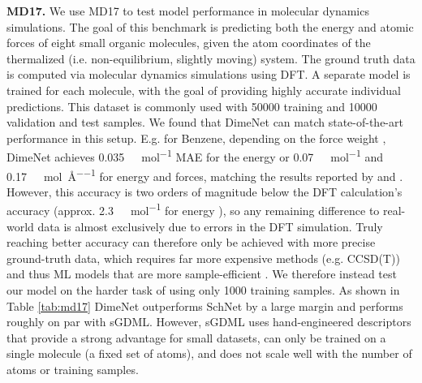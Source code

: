 \documentclass{article} \usepackage{iclr2020_conference,times}
\begin{document}
\textbf{MD17.} We use MD17 \citep{chmiela_machine_2017} to test model performance in molecular dynamics simulations. The goal of this benchmark is predicting both the energy and atomic forces of eight small organic molecules, given the atom coordinates of the thermalized (i.e. non-equilibrium, slightly moving) system. The ground truth data is computed via molecular dynamics simulations using DFT. A separate model is trained for each molecule, with the goal of providing highly accurate individual predictions. This dataset is commonly used with \num{50000} training and \num{10000} validation and test samples. We found that DimeNet can match state-of-the-art performance in this setup. E.g. for Benzene, depending on the force weight , DimeNet achieves \SI{0.035}{\kilo\cal\per\mol} MAE for the energy or \SI{0.07}{\kilo\cal\per\mol} and \SI{0.17}{\kilo\cal\per\mol\per\angstrom} for energy and forces, matching the results reported by \citet{anderson_cormorant:_2019} and \citet{unke_physnet:_2019}. However, this accuracy is two orders of magnitude below the DFT calculation's accuracy (approx. \SI{2.3}{\kilo\cal\per\mol} for energy \citep{faber_machine_2017}), so any remaining difference to real-world data is almost exclusively due to errors in the DFT simulation. Truly reaching better accuracy can therefore only be achieved with more precise ground-truth data, which requires far more expensive methods (e.g. CCSD(T)) and thus ML models that are more sample-efficient \citep{chmiela_towards_2018}. We therefore instead test our model on the harder task of using only \num{1000} training samples. As shown in Table \ref{tab:md17} DimeNet outperforms SchNet by a large margin and performs roughly on par with sGDML. However, sGDML uses hand-engineered descriptors that provide a strong advantage for small datasets, can only be trained on a single molecule (a fixed set of atoms), and does not scale well with the number of atoms or training samples.
\end{document}
